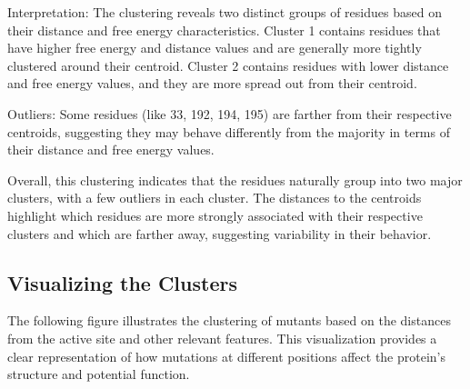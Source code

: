 \documentclass{article}
\begin{document}
Interpretation: The clustering reveals two distinct groups of residues based on their distance and free energy characteristics. Cluster 1 contains residues that have higher free energy and distance values and are generally more tightly clustered around their centroid. Cluster 2 contains residues with lower distance and free energy values, and they are more spread out from their centroid.

Outliers: Some residues (like 33, 192, 194, 195) are farther from their respective centroids, suggesting they may behave differently from the majority in terms of their distance and free energy values.

Overall, this clustering indicates that the residues naturally group into two major clusters, with a few outliers in each cluster. The distances to the centroids highlight which residues are more strongly associated with their respective clusters and which are farther away, suggesting variability in their behavior.

\FloatBarrier %

\subsection{Visualizing the Clusters}

The following figure illustrates the clustering of mutants based on the distances from the active site and other relevant features. This visualization provides a clear representation of how mutations at different positions affect the protein’s structure and potential function.
\end{document}
